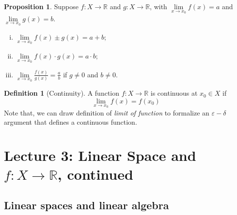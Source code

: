 \documentclass[12pt]{article}
\newcommand{\R}{{\mathbb R}}
\theoremstyle{definition}
\newtheorem{definition}[theorem]{Definition}
\newtheorem{proposition}[theorem]{Proposition}
\theoremstyle{plain}
\begin{document}
\begin{proposition}
    Suppose $f: X \to \R$ and $g: X \to \R$, with $\underset{x\to x_0} \lim
    f(x) = a$ and $\underset{x\to x_0} \lim g(x) = b$.
    \begin{enumerate}[(i)]
        \item $\underset{x\to x_0} \lim f(x) \pm g(x) = a + b$;
        \item $\underset{x\to x_0} \lim f(x) \cdot g(x) = a\cdot b$;
        \item $\underset{x\to x_0} \lim \frac{f(x)}{g(x)} = \frac{a}{b}$ if $g
            \not= 0$ and $b \not= 0$.
    \end{enumerate}
\end{proposition}

\begin{definition}
    [Continuity] A function $f: X \to \R$ is continuous at $x_0 \in X$ if
    \[
        \underset{x\to x_0} \lim f(x) = f(x_0)
    \]
    Note that, we can draw definition of \textit{limit of function} to formalize
    an $\varepsilon-\delta$ argument that defines a continuous function.
\end{definition}


\section{Lecture 3: Linear Space and $f: X \to \R$, continued}

\subsection{Linear spaces and linear algebra}
\end{document}
